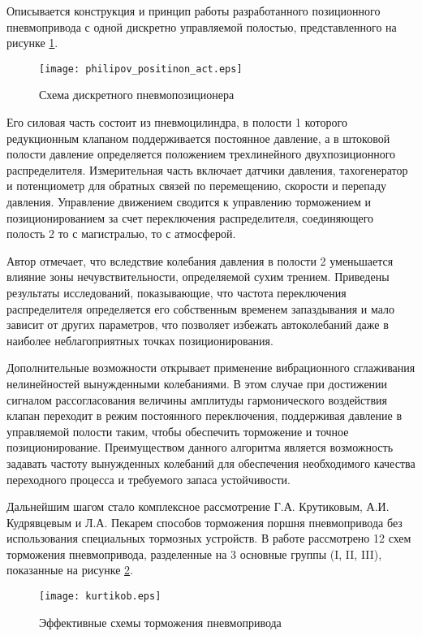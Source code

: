 Описывается конструкция и принцип работы разработанного позиционного пневмопривода с одной дискретно управляемой полостью, представленного
на рисунке \cref*{fig:позиционный_пп_филипов}.

\begin{figure}[h]
	\centerfloat
	\texttt{[image: philipov\_positinon\_act.eps]}
	\caption{Схема дискретного пневмопозиционера}\label{fig:позиционный_пп_филипов}
\end{figure}

Его силовая часть состоит из пневмоцилиндра, в полости 1 которого редукционным клапаном поддерживается
постоянное давление, а в штоковой полости давление определяется положением трехлинейного двухпозиционного распределителя. Измерительная
часть включает датчики давления, тахогенератор и потенциометр для обратных связей по перемещению, скорости и перепаду
давления. Управление движением сводится к управлению торможением и позиционированием за счет переключения распределителя,
соединяющего полость 2 то с магистралью, то с атмосферой.

Автор отмечает, что вследствие колебания давления в полости 2 уменьшается влияние зоны нечувствительности,
определяемой сухим трением. Приведены результаты исследований, показывающие, что частота переключения распределителя определяется
его собственным временем запаздывания и мало зависит от других параметров, что позволяет избежать автоколебаний даже
в наиболее неблагоприятных точках позиционирования.

Дополнительные возможности открывает применение вибрационного сглаживания нелинейностей вынужденными колебаниями.
В этом случае при достижении сигналом рассогласования величины амплитуды гармонического воздействия клапан переходит
в режим постоянного переключения, поддерживая давление в управляемой полости таким, чтобы обеспечить торможение и точное
позиционирование. Преимуществом данного алгоритма является возможность задавать частоту вынужденных колебаний для
обеспечения необходимого качества переходного процесса и требуемого запаса устойчивости.

Дальнейшим шагом стало комплексное рассмотрение Г.А. Крутиковым, А.И. Кудрявцевым и Л.А. Пекарем \cite*{крутиков:способы_торможения_12}
способов торможения поршня пневмопривода без использования специальных тормозных устройств. В работе
рассмотрено 12 схем торможения пневмопривода, разделенные на 3 основные группы (I, II, III), показанные на рисунке \cref*{fig:эффективные_схемы_торможения_12}.

\begin{figure}[h]
    \centerfloat
    \texttt{[image: kurtikob.eps]}
    \caption{Эффективные схемы торможения пневмопривода}\label{fig:эффективные_схемы_торможения_12}
\end{figure}

